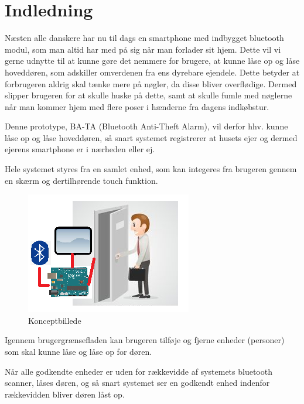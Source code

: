 \graphicspath{{Chapters/Indledning/}}

\section{Indledning}
Næsten alle danskere har nu til dags en smartphone med indbygget bluetooth modul, som man altid har med på sig når man forlader sit hjem. Dette vil vi gerne udnytte til at kunne gøre det nemmere for brugere, at kunne låse op og låse hoveddøren, som adskiller omverdenen fra ens dyrebare ejendele. Dette betyder at forbrugeren aldrig skal tænke mere på nøgler, da disse bliver overflødige. Dermed slipper brugeren for at skulle huske på dette, samt at skulle fumle med nøglerne når man kommer hjem med flere poser i hænderne fra dagens indkøbstur. 

Denne prototype, BA-TA (Bluetooth Anti-Theft Alarm), vil derfor hhv. kunne låse op og låse hoveddøren, så snart systemet registrerer at husets ejer og dermed ejerens smartphone er i nærheden eller ej.


Hele systemet styres fra en samlet enhed, som kan integeres fra brugeren gennem en skærm og dertilhørende touch funktion. 

\begin{figure}[H]
	\centering
	\includegraphics[width = 300 pt]{Img/Konceptbillede.png}
	\caption{Konceptbillede}
	\label{fig:Konceptbillede}
\end{figure}

Igennem brugergrænsefladen kan brugeren tilføje og fjerne enheder (personer) som skal kunne låse og låse op for døren.

Når alle godkendte enheder er uden for rækkevidde af systemets bluetooth scanner, låses døren, og så snart systemet ser en godkendt enhed indenfor rækkevidden bliver døren låst op. 

